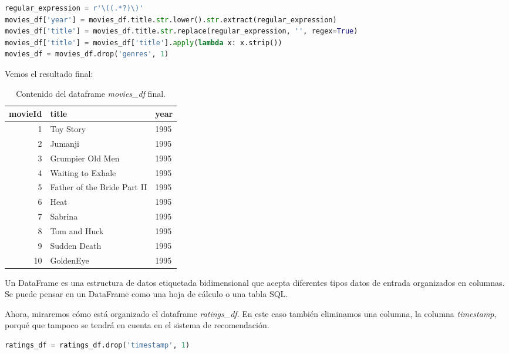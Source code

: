 \documentclass{uimppracticas}
\begin{document}
\begin{lstlisting}[language=python]
regular_expression = r'\((.*?)\)'
movies_df['year'] = movies_df.title.str.lower().str.extract(regular_expression)
movies_df['title'] = movies_df.title.str.replace(regular_expression, '', regex=True)
movies_df['title'] = movies_df['title'].apply(lambda x: x.strip())
movies_df = movies_df.drop('genres', 1)
\end{lstlisting}

Vemos el resultado final:

\begin{table}[H]
	\centering
	\begin{tabular}{rll}
		\toprule
		movieId &                  title &  year \\
		\midrule
		1 &                    Toy Story &  1995 \\
		2 &                      Jumanji &  1995 \\
		3 &             Grumpier Old Men &  1995 \\
		4 &            Waiting to Exhale &  1995 \\
		5 &  Father of the Bride Part II &  1995 \\
		6 &                         Heat &  1995 \\
		7 &                      Sabrina &  1995 \\
		8 &                 Tom and Huck &  1995 \\
		9 &                 Sudden Death &  1995 \\
		10 &                    GoldenEye &  1995 \\
		\bottomrule
	\end{tabular}
	\caption{Contenido del dataframe \textit{movies\_df} final.}
	\label{movies_df_final}
\end{table}

\begin{definition}\label{dataframe}
	Un DataFrame es una estructura de datos etiquetada bidimensional que acepta diferentes tipos datos de entrada organizados en columnas. Se puede pensar en un DataFrame como una hoja de cálculo o una tabla SQL.
\end{definition}

Ahora, miraremos cómo está organizado el dataframe \textit{ratings\_df}. En este caso también eliminamos una columna, la columna \textit{timestamp}, porqué que tampoco se tendrá en cuenta en el sistema de recomendación.

\begin{lstlisting}[language=python]
ratings_df = ratings_df.drop('timestamp', 1)
\end{lstlisting}
\end{document}
